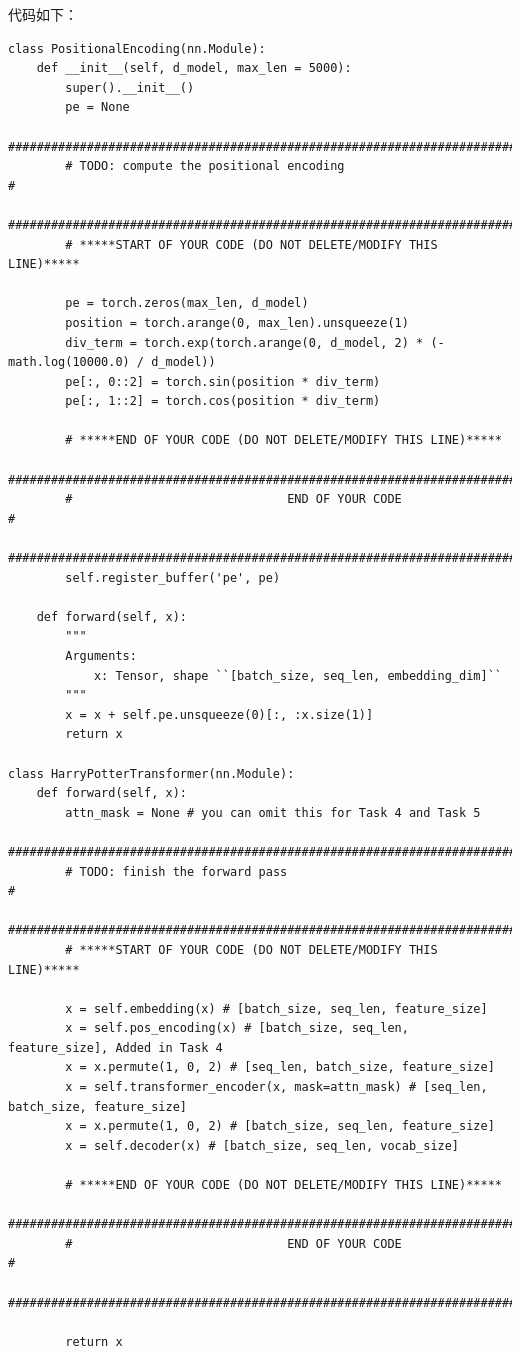 \documentclass{article}%
\begin{document}
代码如下：
\begin{lstlisting}
class PositionalEncoding(nn.Module):
    def __init__(self, d_model, max_len = 5000):
        super().__init__()
        pe = None
        ################################################################################
        # TODO: compute the positional encoding                                        #
        ################################################################################
        # *****START OF YOUR CODE (DO NOT DELETE/MODIFY THIS LINE)*****

        pe = torch.zeros(max_len, d_model)
        position = torch.arange(0, max_len).unsqueeze(1)
        div_term = torch.exp(torch.arange(0, d_model, 2) * (-math.log(10000.0) / d_model))
        pe[:, 0::2] = torch.sin(position * div_term)
        pe[:, 1::2] = torch.cos(position * div_term)

        # *****END OF YOUR CODE (DO NOT DELETE/MODIFY THIS LINE)*****
        ################################################################################
        #                              END OF YOUR CODE                                #
        ################################################################################
        self.register_buffer('pe', pe)

    def forward(self, x):
        """
        Arguments:
            x: Tensor, shape ``[batch_size, seq_len, embedding_dim]``
        """
        x = x + self.pe.unsqueeze(0)[:, :x.size(1)]
        return x

class HarryPotterTransformer(nn.Module):
    def forward(self, x):        
        attn_mask = None # you can omit this for Task 4 and Task 5
        ################################################################################
        # TODO: finish the forward pass                                                #
        ################################################################################
        # *****START OF YOUR CODE (DO NOT DELETE/MODIFY THIS LINE)*****

        x = self.embedding(x) # [batch_size, seq_len, feature_size]
        x = self.pos_encoding(x) # [batch_size, seq_len, feature_size], Added in Task 4
        x = x.permute(1, 0, 2) # [seq_len, batch_size, feature_size]
        x = self.transformer_encoder(x, mask=attn_mask) # [seq_len, batch_size, feature_size]
        x = x.permute(1, 0, 2) # [batch_size, seq_len, feature_size]
        x = self.decoder(x) # [batch_size, seq_len, vocab_size]

        # *****END OF YOUR CODE (DO NOT DELETE/MODIFY THIS LINE)*****
        ################################################################################
        #                              END OF YOUR CODE                                #
        ################################################################################

        return x
\end{lstlisting}
\end{document}
